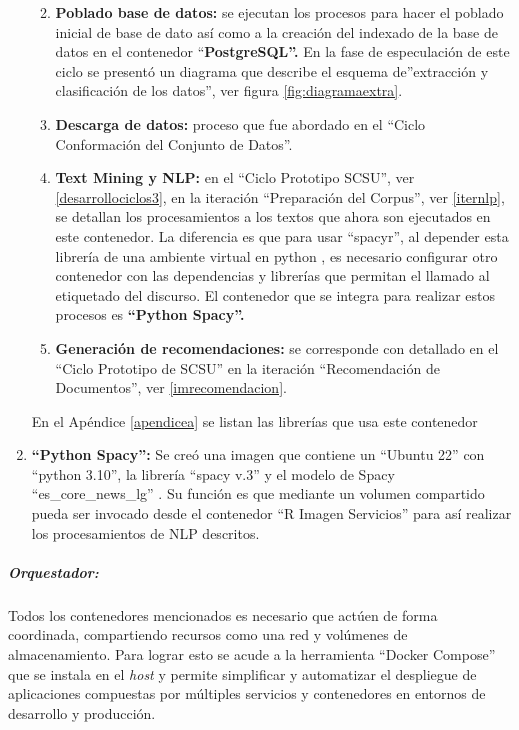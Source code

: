 \documentclass[
  12pt,
  openany]{book}
\providecommand{\tightlist}{%
  \setlength{\itemsep}{0pt}\setlength{\parskip}{0pt}}
\begin{document}
\begin{enumerate}
  \begin{enumerate}
  \def\labelenumii{\arabic{enumii}.}
  \tightlist
  \item
    \textbf{Poblado base de datos:} se ejecutan los procesos para hacer el poblado inicial de base de dato así como a la creación del indexado de la base de datos en el contenedor ``\textbf{PostgreSQL''.} En la fase de especulación de este ciclo se presentó un diagrama que describe el esquema de''extracción y clasificación de los datos'', ver figura \ref{fig:diagramaextra}.
  \item
    \textbf{Descarga de datos:} proceso que fue abordado en el ``Ciclo Conformación del Conjunto de Datos''.
  \item
    \textbf{Text Mining y NLP:} en el ``Ciclo Prototipo SCSU'', ver \ref{desarrollociclos3}, en la iteración ``Preparación del Corpus'', ver \ref{iternlp}, se detallan los procesamientos a los textos que ahora son ejecutados en este contenedor. La diferencia es que para usar ``spacyr'', al depender esta librería de una ambiente virtual en python , es necesario configurar otro contenedor con las dependencias y librerías que permitan el llamado al etiquetado del discurso. El contenedor que se integra para realizar estos procesos es \textbf{``Python Spacy''.}
  \item
    \textbf{Generación de recomendaciones:} se corresponde con detallado en el ``Ciclo Prototipo de SCSU'' en la iteración ``Recomendación de Documentos'', ver \ref{imrecomendacion}.
  \end{enumerate}

  En el Apéndice \ref{apendicea} se listan las librerías que usa este contenedor
\item
  \textbf{``Python Spacy'':} Se creó una imagen que contiene un ``Ubuntu 22'' con ``python 3.10'', la librería ``spacy v.3'' y el modelo de Spacy ``es\_core\_news\_lg'' . Su función es que mediante un volumen compartido pueda ser invocado desde el contenedor ``R Imagen Servicios'' para así realizar los procesamientos de NLP descritos.
\end{enumerate}

\hypertarget{orquestador-1}{%
\subparagraph{Orquestador:}\label{orquestador-1}}

Todos los contenedores mencionados es necesario que actúen de forma coordinada, compartiendo recursos como una red y volúmenes de almacenamiento. Para lograr esto se acude a la herramienta ``Docker Compose'' que se instala en el \emph{host} y permite simplificar y automatizar el despliegue de aplicaciones compuestas por múltiples servicios y contenedores en entornos de desarrollo y producción.
\end{document}
